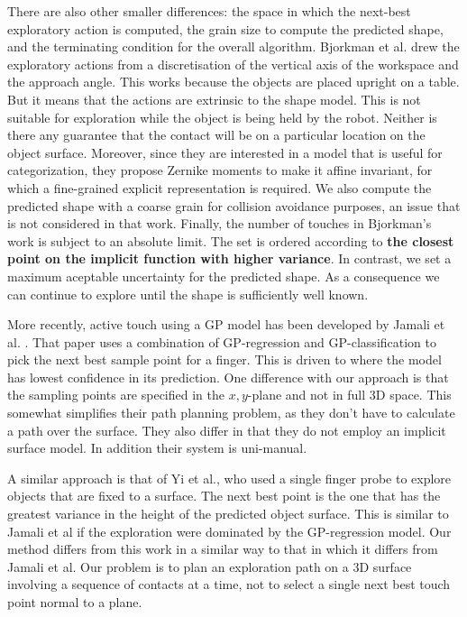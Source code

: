 There are also other smaller differences: the space in which the next-best exploratory action is computed, the grain size to compute the predicted shape, and the terminating condition for the overall algorithm.
Bjorkman et al.
\cite{Bjorkman2013Enhancing}
drew the exploratory actions from a discretisation of the vertical axis of the workspace and the approach angle. This works because the objects are placed upright on a table. But it means that the actions are extrinsic to the shape model. This is not suitable for exploration while the object is being held by the robot. Neither is there any guarantee that the contact will be on a particular location on the object surface. Moreover, since they are interested in a model that is useful for categorization, they propose Zernike moments to make it affine invariant, for which a fine-grained explicit representation is required. We also compute the predicted shape with a coarse grain for collision avoidance purposes, an issue that is not considered in that work. Finally, the number of touches in Bjorkman's work is subject to an absolute limit. The set is ordered according to {\bf the closest point on the implicit function with higher variance}. In contrast, we set a maximum aceptable uncertainty for the predicted shape. As a consequence we can continue to explore until the shape is sufficiently well known.

More recently, active touch using a GP model has been developed by Jamali et al. \cite{jamali2016}. That paper uses a combination of GP-regression and GP-classification to pick the next best sample point for a finger. This is driven to where the model has lowest confidence in its prediction. One difference with our approach is that the sampling points are specified in the $x,y$-plane and not in full 3D space. This somewhat simplifies their path planning problem, as they don't have to calculate a path over the surface. They also differ in that they do not employ an implicit surface model. In addition their system is uni-manual. 

A similar approach is that of Yi et al., who used a single finger probe to explore objects that are fixed to a surface. The next best point is the one that has the greatest variance in the height of the predicted object surface. This is similar to Jamali et al if the exploration were dominated by the GP-regression model. Our method differs from this work in a similar way to that in which it differs from Jamali et al. Our problem is to plan an exploration path on a 3D surface involving a sequence of contacts at a time, not to select a single next best touch point normal to a plane.

